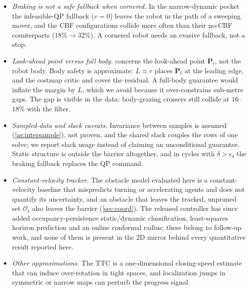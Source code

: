 \begin{itemize}
    \item \emph{Braking is not a safe fallback when cornered.} In the narrow-dynamic pocket the infeasible-QP fallback ($v=0$) leaves the robot in the path of a sweeping mover, and the CBF configurations collide more often than their no-CBF counterparts ($18\%\to32\%$). A cornered robot needs an evasive fallback, not a stop.
    \item \emph{Look-ahead point versus full body.}  concerns the look-ahead point $\mathbf{P}_t$, not the robot body. Body safety is approximate: $L\approx r$ places $\mathbf{P}_t$ at the leading edge, and the costmap critic and  cover the residual. A full-body guarantee would inflate the margin by $L$, which we avoid because it over-constrains sub-metre gaps. The gap is visible in the data: body-grazing crossers still collide at $16$--$18\%$ with the filter.
    \item \emph{Sampled-data and slack caveats.} Invariance between samples is assumed (\cref{as:intersample}), not proven, and the shared slack couples the rows of one solve; we report slack usage instead of claiming an unconditional guarantee. Static structure is outside the barrier altogether, and in cycles with $\delta>\epsilon_\delta$ the braking fallback replaces the QP command.
    \item \emph{Constant-velocity tracker.} The obstacle model evaluated here is a constant-velocity baseline that mispredicts turning or accelerating agents and does not quantify its uncertainty, and an obstacle that leaves the tracked, unpruned set $\mathcal{O}_t$ also leaves the barrier (\cref{sec:coord}). The released controller has since added occupancy-persistence static/dynamic classification, least-squares horizon prediction and an online conformal radius; these belong to follow-up work, and none of them is present in the 2D mirror behind every quantitative result reported here.
    \item \emph{Other approximations.} The TTC is a one-dimensional closing-speed estimate that can induce over-rotation in tight spaces, and localization jumps in symmetric or narrow maps can perturb the progress signal.
\end{itemize}

